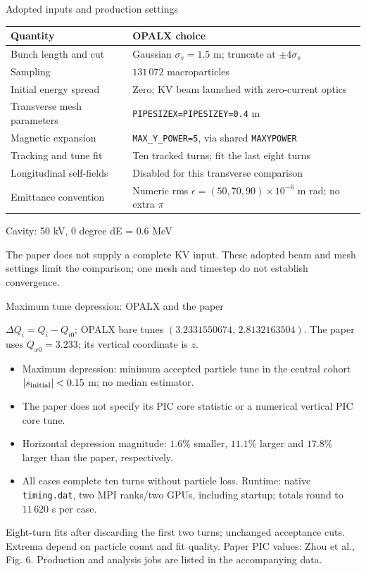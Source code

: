 \documentclass[aspectratio=169,11pt]{beamer}
\newcommand{\src}[1]{\par\vfill{\color{muted}\scriptsize #1\par}}
\begin{document}
\begin{frame}{Adopted inputs and production settings}
\small
\begin{tabularx}{\linewidth}{lY}
\toprule Quantity & OPALX choice \\
\midrule
Bunch length and cut & Gaussian $\sigma_s=1.5$ m; truncate at $\pm4\sigma_s$ \\
Sampling & $131\,072$ macroparticles \\
Initial energy spread & Zero; KV beam launched with zero-current optics \\
Transverse mesh parameters & \texttt{PIPESIZEX=PIPESIZEY=0.4} m \\
Magnetic expansion & \texttt{MAX\_Y\_POWER=5}, via shared \texttt{MAXYPOWER} \\
Tracking and tune fit & Ten tracked turns; fit the last eight turns \\
Longitudinal self-fields & Disabled for this transverse comparison \\
Emittance convention & Numeric rms $\epsilon=(50,70,90)\times10^{-6}$ m rad; no extra $\pi$ \\
\bottomrule
\end{tabularx}\par
\vspace{3mm}

Cavity: 50 kV, 0 degree
dE = 0.6 MeV

\footnotesize The paper does not supply a complete KV input. These adopted beam and mesh settings limit the comparison; one mesh and timestep do not establish convergence.
\end{frame}

\begin{frame}{Maximum tune depression: OPALX and the paper}
\small
\begin{center}\setlength{\tabcolsep}{5pt}\end{center}
\vspace{1mm}
\footnotesize
$\Delta Q_i=Q_i-Q_{i0}$; OPALX bare tunes $(3.2331550674,\,2.8132163504)$.
The paper uses $Q_{x0}=3.233$; its vertical coordinate is $z$.
\begin{itemize}
\item Maximum depression: minimum accepted particle tune in the central cohort $|s_{\rm initial}|<0.15$ m; no median estimator.
\item The paper does not specify its PIC core statistic or a numerical vertical PIC core tune.
\item Horizontal depression magnitude: $1.6\%$ smaller, $11.1\%$ larger and $17.8\%$ larger than the paper, respectively.
\item All cases complete ten turns without particle loss. Runtime: native \texttt{timing.dat}, two MPI ranks/two GPUs, including startup; totals round to $11\,620$ s per case.
\end{itemize}
\src{Eight-turn fits after discarding the first two turns; unchanged acceptance cuts. Extrema depend on particle count and fit quality. Paper PIC values: Zhou et al., Fig. 6. Production and analysis jobs are listed in the accompanying data.}
\end{frame}
\end{document}

